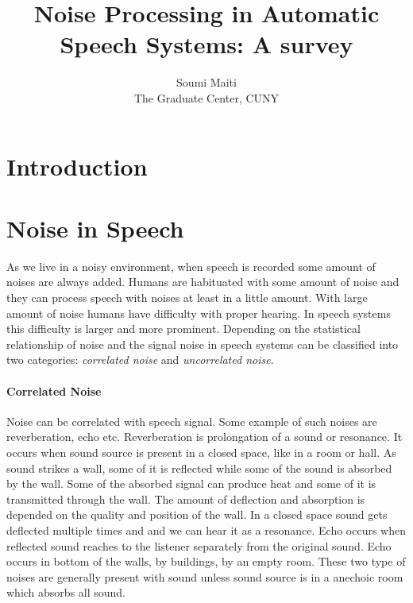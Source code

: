 \documentclass[journal,  onecolumn, 12pt]{IEEEtran}
\begin{document}
\title{Noise Processing in Automatic Speech Systems: A survey}


\author{Soumi Maiti \\The Graduate Center, CUNY}
\maketitle

\begin{abstract}

\end{abstract}











\section{Introduction}
\section{Noise in Speech}
As we live in a noisy environment, when speech is recorded some amount of noises are always added. Humans are habituated with some amount of noise and they can process speech with noises at least in a little amount. With large amount of noise humans have difficulty with proper hearing. In speech systems this difficulty is larger and more prominent. Depending on the statistical relationship of noise and the signal noise in speech systems can be classified into two categories: \emph{correlated noise} and \emph{uncorrelated noise}. 

\paragraph*{Correlated Noise}
Noise can be correlated with speech signal. Some example of such noises are reverberation, echo etc. Reverberation is prolongation of a sound or resonance. It occurs when sound source is present in a closed space, like in a room or hall. As sound strikes a wall, some of it is reflected while some of the sound is absorbed by the wall. Some of the absorbed signal can produce heat and some of it is transmitted through the wall. The amount of deflection and absorption is depended on the quality and position of the wall. In a closed space sound gets deflected multiple times and and we can hear it as a resonance. Echo occurs when reflected sound reaches to the listener separately from the original sound. Echo occurs in bottom of the walls, by buildings, by an empty room. These two type of noises are generally present with sound unless sound source is in a anechoic room which absorbs all sound. 
\end{document}
